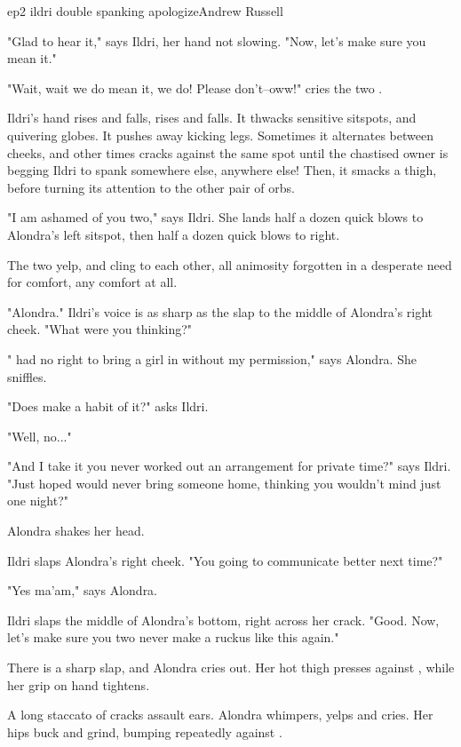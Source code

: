 \documentclass{book}
\begin{document}
\begin{childnode}{ep2 ildri double spanking apologize}{Andrew Russell}

    "Glad to hear it," says Ildri, her hand not slowing. "Now, let's make sure you mean it."

    "Wait, wait we do mean it, we do! Please don't--oww!" cries the two . 

    Ildri's hand rises and falls, rises and falls. It thwacks sensitive sitspots, and quivering globes. It pushes away kicking legs. Sometimes it alternates between cheeks, and other times cracks
    against the same spot until the chastised owner is begging Ildri to spank somewhere else, anywhere else! Then, it smacks a thigh, before turning its attention to the other pair of orbs.

    "I am ashamed of you two," says Ildri. She lands half a dozen quick blows to Alondra's left sitspot, then half a dozen quick blows to \names{} right.

    The two yelp, and cling to each other, all animosity forgotten in a desperate need for comfort, any comfort at all.

    "Alondra." Ildri's voice is as sharp as the slap to the middle of Alondra's right cheek. "What were you thinking?"

    "\HeShe{} had no right to bring a girl in without my permission," says Alondra. She sniffles.

    "Does \heshe{} make a habit of it?" asks Ildri.

    "Well, no..."

    "And I take it you never worked out an arrangement for private time?" says Ildri. "Just hoped \name{} would never bring someone home, thinking you wouldn't mind just one night?" 

    Alondra shakes her head. 

    Ildri slaps Alondra's right cheek. "You going to communicate better next time?"

    "Yes ma'am," says Alondra.

    Ildri slaps the middle of Alondra's bottom, right across her crack. "Good. Now, let's make sure you two never make a ruckus like this again."    

    There is a sharp slap, and Alondra cries out. Her hot thigh presses against \names{}, while her grip on \names{} hand tightens.

    A long staccato of cracks assault \names{} ears. Alondra whimpers, yelps and cries. Her hips buck and grind, bumping repeatedly against 
    \names{}.


\end{childnode}
\end{document}
